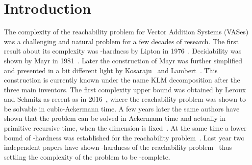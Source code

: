 \section{Introduction}
The complexity of the reachability problem for Vector Addition Systems (VASes) was a challenging and natural problem
for a few decades of research. The first result about its complexity
was \expspace-hardness by Lipton in 1976~\cite{Lipton76}.
Decidability was shown by Mayr in 1981~\cite{DBLP:conf/stoc/Mayr81}.
Later the construction of Mayr was further simplified and presented in a bit different light
by Kosaraju~\cite{DBLP:conf/stoc/Kosaraju82} and Lambert~\cite{DBLP:journals/tcs/Lambert92}.
This construction is currently known under the name KLM decomposition after the three main inventors.
The first complexity upper bound was obtained by Leroux and Schmitz as recent as in 2016~\cite{DBLP:conf/lics/LerouxS15},
where the reachability problem was shown to be solvable in cubic-Ackermann time. A few years later
the same authors have shown that the problem can be solved in Ackermann time and actually in primitive
recursive time, when the dimension is fixed~\cite{DBLP:conf/lics/LerouxS19}.
At the same time a lower bound of \tower-hardness was established for the reachability
problem~\cite{DBLP:conf/stoc/CzerwinskiLLLM19,DBLP:journals/jacm/CzerwinskiLLLM21}. Last year two independent
papers have shown \ackermann-hardness of the reachability
problem~\cite{DBLP:conf/focs/Leroux21, DBLP:conf/focs/CzerwinskiO21}
thus settling the complexity of the problem to be \ackermann-complete.

